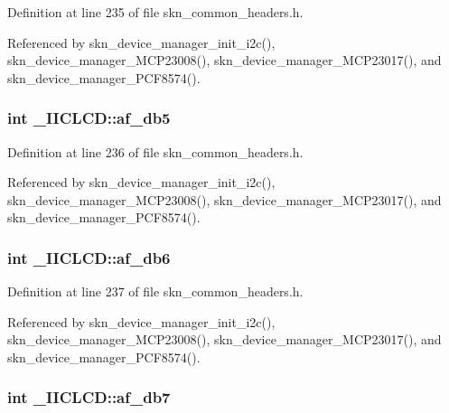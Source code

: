 Definition at line 235 of file skn\+\_\+common\+\_\+headers.\+h.



Referenced by skn\+\_\+device\+\_\+manager\+\_\+init\+\_\+i2c(), skn\+\_\+device\+\_\+manager\+\_\+\+M\+C\+P23008(), skn\+\_\+device\+\_\+manager\+\_\+\+M\+C\+P23017(), and skn\+\_\+device\+\_\+manager\+\_\+\+P\+C\+F8574().

\hypertarget{struct___i_i_c_l_c_d_a41c4536106493476b52c9a9df9dd8599}{
\subsubsection[{af\+\_\+db5}]{\setlength{\rightskip}{0pt plus 5cm}int \+\_\+\+I\+I\+C\+L\+C\+D\+::af\+\_\+db5}}\label{struct___i_i_c_l_c_d_a41c4536106493476b52c9a9df9dd8599}


Definition at line 236 of file skn\+\_\+common\+\_\+headers.\+h.



Referenced by skn\+\_\+device\+\_\+manager\+\_\+init\+\_\+i2c(), skn\+\_\+device\+\_\+manager\+\_\+\+M\+C\+P23008(), skn\+\_\+device\+\_\+manager\+\_\+\+M\+C\+P23017(), and skn\+\_\+device\+\_\+manager\+\_\+\+P\+C\+F8574().

\hypertarget{struct___i_i_c_l_c_d_a0f3ebbe756ecf62494733287f64821f9}{
\subsubsection[{af\+\_\+db6}]{\setlength{\rightskip}{0pt plus 5cm}int \+\_\+\+I\+I\+C\+L\+C\+D\+::af\+\_\+db6}}\label{struct___i_i_c_l_c_d_a0f3ebbe756ecf62494733287f64821f9}


Definition at line 237 of file skn\+\_\+common\+\_\+headers.\+h.



Referenced by skn\+\_\+device\+\_\+manager\+\_\+init\+\_\+i2c(), skn\+\_\+device\+\_\+manager\+\_\+\+M\+C\+P23008(), skn\+\_\+device\+\_\+manager\+\_\+\+M\+C\+P23017(), and skn\+\_\+device\+\_\+manager\+\_\+\+P\+C\+F8574().

\hypertarget{struct___i_i_c_l_c_d_ae55385ca612fd157fb85e7b3d5423ee4}{
\subsubsection[{af\+\_\+db7}]{\setlength{\rightskip}{0pt plus 5cm}int \+\_\+\+I\+I\+C\+L\+C\+D\+::af\+\_\+db7}}\label{struct___i_i_c_l_c_d_ae55385ca612fd157fb85e7b3d5423ee4}


